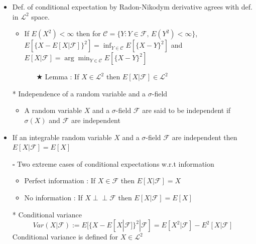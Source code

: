 \documentclass[12pt, A4]{article}
\newcommand{\indep}{\perp \!\!\! \perp}
\newcommand{\sq}{$\square$}
\newcommand{\trick}{$\bigstar$}
\newcommand{\C}{\mathcal{C}}
\newcommand{\F}{\mathcal{F}}
\newcommand{\LL}{\mathcal{L}}
\begin{document}
\begin{itemize}
	\item Def. of conditional expectation by Radon-Nikodym derivative agrees with def. in $\LL^2$ space.
	\begin{itemize}
		\item If $E(X^2)<\infty$ then for  $\C=\{Y : Y\in \F, \, E(Y^2)<\infty\}$, \\ $E[\{X-E[X|\F]\}^2]=\inf_{Y\in \C} E[\{X-Y\}^2]$ and $E[X|\F]=\arg\min_{Y\in \C} E[\{X-Y\}^2]$
		\begin{itemize}
			\item[\trick] Lemma : If $X\in \LL^2$ then $E[X|\F]\in \LL^2$
		\end{itemize}
	\end{itemize}
	\item[*] Independence of a random variable and a $\sigma$-field
	\begin{itemize}
		\item A random variable $X$ and a $\sigma$-field $\F$ are said to be independent if $\sigma(X)$ and $\F$ are independent
	\end{itemize}
	\item If an integrable random variable $X$ and a $\sigma$-field $\F$ are independent then $E[X|\F]=E[X]$ 
	\item[\sq] Two extreme cases of conditional expectations w.r.t information
	\begin{itemize}
		\item Perfect information : If $X\in \F$ then $E[X|\F]=X$
		\item No information : If $X \indep \F$ then $E[X|\F]=E[X]$
	\end{itemize} 
	\item[*] Conditional variance
	\begin{equation*}
		Var(X|\F):=E[\{X-E[X|\F]\}^2|\F] = E[X^2|\F]-E^2[X|\F]
	\end{equation*}
	Conditional variance is defined for $X\in \LL^2$
	
\end{itemize}
\clearpage 
\end{document}
